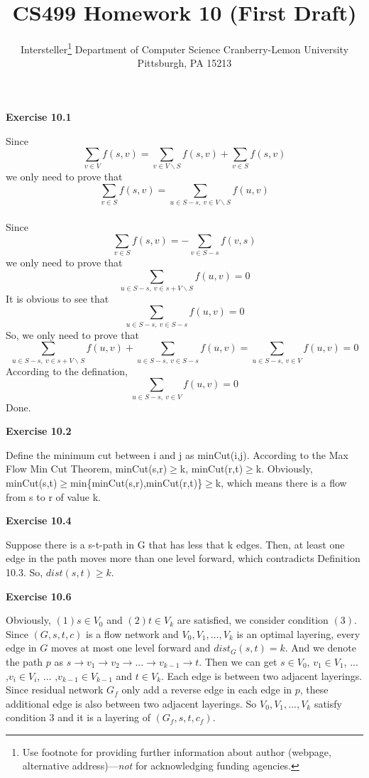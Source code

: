 \documentclass{article} %
\title{CS499 Homework 10 (First Draft)}
\author{
	Intersteller\thanks{ Use footnote for providing further information
		about author (webpage, alternative address)---\emph{not} for acknowledging
		funding agencies.}
	Department of Computer Science
	Cranberry-Lemon University
	Pittsburgh, PA 15213
}
\begin{document}
	
	
	\maketitle
	
	
	\textbf{Exercise 10.1}\par
	Since $$\sum_{v\in V}f(s,v)=\sum_{v\in V\backslash S}f(s,v)+\sum_{v\in S}f(s,v)$$ we only need to prove that $$\sum_{v\in S}f(s,v)=\sum_{u\in S-s,\ v\in V\backslash S}f(u,v)$$\\
	Since $$\sum_{v\in S}f(s,v)=-\sum_{v\in S-s}f(v,s)$$ we only need to prove that $$\sum_{u\in S-s,\ v\in s+V\backslash S}f(u,v)=0$$
	It is obvious to see that $$\sum_{u\in S-s,\ v\in S-s}f(u,v)=0$$
	So, we only need to prove that $$\sum_{u\in S-s,\ v\in s+V\backslash S}f(u,v)+\sum_{u\in S-s,\ v\in S-s}f(u,v)=\sum_{u\in S-s,\ v\in V}f(u,v)=0$$
	According to the defination, $$\sum_{u\in S-s,\ v\in V}f(u,v)=0$$
	Done.


	\textbf{Exercise 10.2}\par
	Define the minimum cut between i and j as minCut(i,j). According to the Max Flow Min Cut Theorem, minCut(s,r)$\geq$k, minCut(r,t)$\geq$k. Obviously, minCut(s,t)$\geq$min\{minCut(s,r),minCut(r,t)\}$\geq$k, which means there is a flow from s to r of value k.

	\textbf{Exercise 10.4}\par
	Suppose there is a s-t-path in G that has less that k edges. Then, at least one edge in the path moves more than one level forward, which contradicts Definition 10.3. So, $dist(s,t)\geq k$.

	
	\textbf{Exercise 10.6}\par
	Obviously, $(1)s\in V_{0}$ and $(2)t\in V_{k}$ are satisfied, we consider condition $(3)$. Since $(G,s,t,c)$ is a flow network 
	and $V_{0},V_{1},...,V_{k}$ is an optimal layering, every edge in $G$ moves at most one level forward and $dist_G(s,t)=k$. And we denote the path $p$ 
	as $s\rightarrow v_{1}\rightarrow v_{2} \rightarrow ...\rightarrow v_{k-1} \rightarrow t $. Then we can get  $s\in V_{0}$, $v_{1}\in V_{1}$, ... ,$v_{i}\in V_{i}$, ... ,$v_{k-1}\in V_{k-1}$ and $t\in V_{k}$. Each edge is between two adjacent layerings. Since residual network $G_{f}$ only add a reverse edge in each edge in $p$, these additional edge is also between two adjacent layerings. So $V_{0},V_{1},...,V_{k}$ satisfy condition $3$ and it is a layering of $(G_{f},s,t,c_{f})$.\par
	
\end{document}
